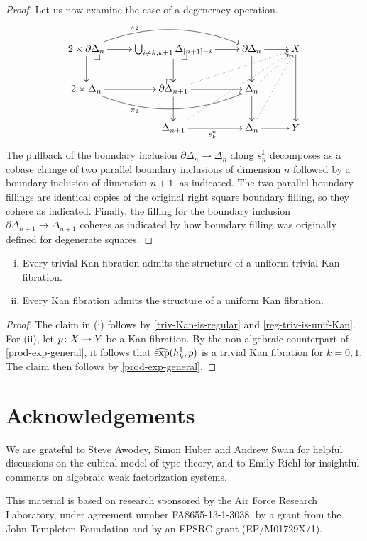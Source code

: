 \documentclass[reqno,10pt,a4paper,oneside,draft]{amsart}
\begin{document}
\begin{proof}
Let us now examine the case of a degeneracy operation.
\[
\xymatrix{
  2 \times \partial \Delta_n
  \ar[r]
  \ar[d]
  \ar@/^2em/[rr]^(0.3){\pi_2}
  \pullback{dr}
&
  \bigcup_{i \neq k, k+1} \Delta_{[n+1] - i}
  \ar[r]
  \ar[d]
  \pullback{dr}
&
  \partial \Delta_n
  \ar[d]
  \ar[r]
&
  X
  \ar[dd]
\\
  2 \times \Delta_n
  \ar[r]
  \ar@/_2em/[rr]_(0.3){\pi_2}
&
  \partial \Delta_{n+1}
  \ar[r]
  \ar[d]
  \ar@{.>}[urr]
  \pullback{ul}
&
  \Delta_n
  \ar[d]
  \ar@{.>}[ur]
\\&
  \Delta_{n+1}
  \ar[r]_{s_k^n}
  \ar@{.>}[uurr]
&
  \Delta_n
  \ar[r]
  \ar@{.>}[uur]
&
  Y
}
\]
The pullback of the boundary inclusion $\partial \Delta_n \to \Delta_n$ along $s^k_n$ decomposes as a cobase change of two parallel boundary inclusions of dimension $n$ followed by a boundary inclusion of dimension $n+1$, as indicated.
The two parallel boundary fillings are identical copies of the original right square boundary filling, so they cohere as indicated.
Finally, the filling for the boundary inclusion~$\partial \Delta_{n+1} \to \Delta_{n+1}$ coheres as indicated by how boundary filling was originally defined for degenerate squares.
\end{proof}

\begin{theorem}[ZFC] \hfill
\begin{enumerate}[(i)]
\item Every trivial Kan fibration admits the structure of a uniform trivial Kan fibration.
\item Every Kan fibration admits the structure of a uniform Kan fibration.
\end{enumerate}
\end{theorem}

\begin{proof}
The claim in (i) follows by \cref{triv-Kan-is-regular} and \cref{reg-triv-is-unif-Kan}.
For (ii), let $p \colon X \to Y$ be a Kan fibration.
By the non-algebraic counterpart of \cref{prod-exp-general}, it follows that $\operatorname{\widehat{exp}}(h_k^1, p)$ is a trivial Kan fibration for $k = 0, 1$.
The claim then follows by \cref{prod-exp-general}.
\end{proof}


\section*{Acknowledgements}

We are grateful to Steve Awodey, Simon Huber and Andrew Swan for helpful discussions on the cubical model of type theory, and to Emily Riehl for insightful comments on algebraic weak factorization systems.

This material is based on research sponsored by the Air Force Research Laboratory, under agreement number FA8655-13-1-3038, by a grant from the John Templeton Foundation and by an EPSRC grant (EP/M01729X/1).




\end{document}
